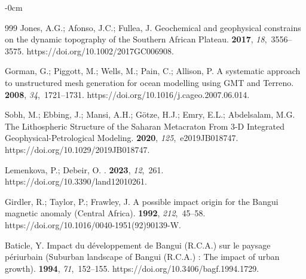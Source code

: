 \documentclass[minerals,article,accept,pdftex,moreauthors]{Definitions/mdpi}
\begin{document}
\begin{adjustwidth}{-\extralength}{0cm}
\begin{thebibliography}{999}
Jones, A.G.; Afonso, J.C.; Fullea, J.
\newblock Geochemical and geophysical constrains on the dynamic topography of
  the Southern African Plateau.
 {\bf 2017}, {\em
  18},~3556--3575.
\newblock https://doi.org/10.1002/2017GC006908.

Gorman, G.; Piggott, M.; Wells, M.; Pain, C.; Allison, P.
\newblock A systematic approach to unstructured mesh generation for ocean
  modelling using GMT and Terreno.
 {\bf 2008}, {\em 34},~1721--1731.
\newblock https://doi.org/10.1016/j.cageo.2007.06.014.

Sobh, M.; Ebbing, J.; Mansi, A.H.; Götze, H.J.; Emry, E.L.; Abdelsalam, M.G.
\newblock The Lithospheric Structure of the Saharan Metacraton From 3-D
  Integrated Geophysical-Petrological Modeling.
 {\bf 2020}, {\em
  125},~e2019JB018747.
\newblock https://doi.org/10.1029/2019JB018747.

Lemenkova, P.; Debeir, O.
.
 {\bf 2023}, {\em 12},~261.
\newblock https://doi.org/10.3390/land12010261.

Girdler, R.; Taylor, P.; Frawley, J.
\newblock A possible impact origin for the Bangui magnetic anomaly (Central
  Africa).
 {\bf 1992}, {\em 212},~45--58.%
\newblock https://doi.org/10.1016/0040-1951(92)90139-W. %

Baticle, Y.
\newblock Impact du développement de Bangui (R.C.A.) sur le paysage
  périurbain (Suburban landscape of Bangui (R.C.A.) : The impact of urban
  growth).
 {\bf 1994},
  {\em 71},~152--155. %
\newblock 
  https://doi.org/10.3406/bagf.1994.1729.


\end{thebibliography}
\end{adjustwidth}
\end{document}
